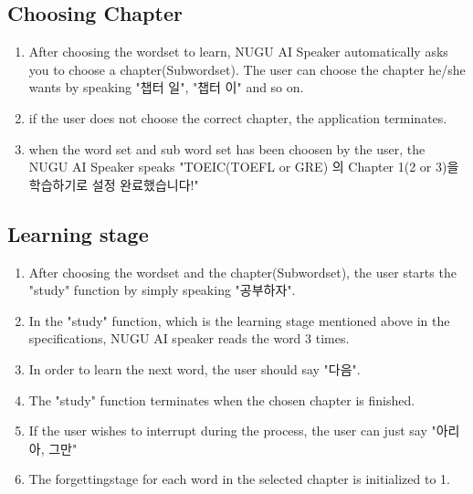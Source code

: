 \documentclass[conference]{IEEEtran}
\begin{document}
    \subsection{Choosing Chapter}
        \begin{enumerate}
            \item After choosing the wordset to learn, NUGU AI Speaker automatically asks you to choose a chapter(Subwordset). The user can choose the chapter he/she wants by speaking "챕터 일", "챕터 이" and so on.
            \item if the user does not choose the correct chapter, the application terminates.
            \item when the word set and sub word set has been choosen by the user, the NUGU AI Speaker speaks "TOEIC(TOEFL or GRE) 의 Chapter 1(2 or 3)을 학습하기로 설정 완료했습니다!"
        \end{enumerate}
    \subsection{Learning stage}
        \begin{enumerate}
            \item After choosing the wordset and the chapter(Subwordset), the user starts the "study" function by simply speaking "공부하자".
            \item In the "study" function, which is the learning stage mentioned above in the specifications, NUGU AI speaker reads the word 3 times.
            \item In order to learn the next word, the user should say "다음".
            \item The "study" function terminates when the chosen chapter is finished.
            \item If the user wishes to interrupt during the process, the user can just say "아리아, 그만"
            \item The forgettingstage for each word in the selected chapter is initialized to 1.
        \end{enumerate}
        
\end{document}
